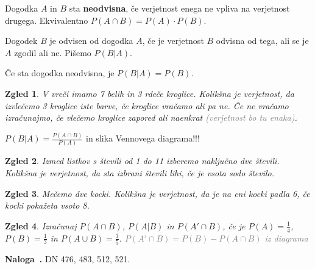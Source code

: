 \documentclass{article}
\newcounter{example}[section]
\newenvironment{example}[1][]{\refstepcounter{example}\par\medskip
   \noindent \textbf{Naloga~\theexample. #1} \rmfamily}{\medskip}
\newtheorem*{zgled}{Zgled}
\begin{document}
Dogodka $A$ in $B$ sta \textbf{neodvisna}, če verjetnost enega ne vpliva na verjetnost drugega. Ekvivalentno $P\left(A\cap B\right) =P(A)\cdot P(B)$.

Dogodek $B$ je odvisen od dogodka $A$, če je verjetnost $B$ odvisna od tega, ali se je $A$ zgodil ali ne. Pišemo $P(B|A)$.

Če sta dogodka neodvisna, je $P(B|A)=P(B)$.

\begin{zgled}
    V vreči imamo 7 belih in 3 rdeče kroglice. Kolikšna je verjetnost, da izvlečemo 3 kroglice iste barve, če kroglice vračamo ali pa ne. Če ne vračamo izračunajmo, če vlečemo kroglice zapored ali naenkrat \textcolor{gray}{(verjetnost bo tu enaka)}.
\end{zgled}

$P(B|A)=\frac{P(A\cap B)}{P(A)}$ in slika Vennovega diagrama!!!

\begin{zgled}
    Izmed listkov s števili od 1 do 11 izberemo naključno dve števili. Kolikšna je verjetnost, da sta izbrani števili lihi, če je vsota sodo število.
\end{zgled}

\begin{zgled}
    Mečemo dve kocki. Kolikšna je verjetnost, da je na eni kocki padla 6, če kocki pokažeta vsoto 8.
\end{zgled}

\begin{zgled}
    Izračunaj $P(A\cap B)$, $P(A|B)$ in $P(A' \cap B)$, če je $P(A)=\frac{1}{4}$, $P(B)=\frac{1}{3}$ in $P(A \cup B)=\frac{3}{5}$. \textcolor{gray}{$P(A' \cap B)=P(B)-P(A\cap B)$ iz diagrama}
\end{zgled}

\begin{example}
    DN 476, 483, 512, 521.
\end{example}
\end{document}
